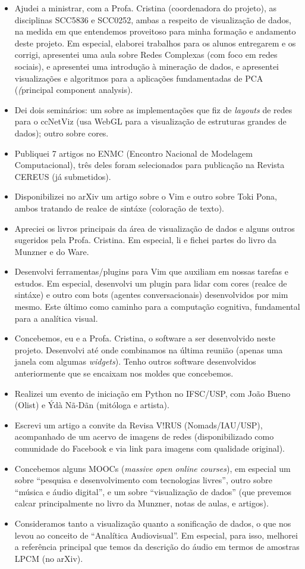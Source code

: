 \documentclass[a4paper, 11pt]{article}
\begin{document}
\begin{itemize}
  \item Ajudei a ministrar, com a Profa. Cristina (coordenadora do projeto), as disciplinas SCC5836 e SCC0252, ambas a respeito de visualização de dados, na medida em que entendemos proveitoso para minha formação e andamento deste projeto.
  Em especial, elaborei trabalhos para os alunos entregarem e os corrigi, apresentei uma aula sobre Redes Complexas (com foco em redes sociais), e apresentei uma introdução à mineração de dados, e apresentei visualizações e algoritmos para a aplicações fundamentadas de PCA (\emph(principal component analysis).
  \item Dei dois seminários: um sobre as implementações que fiz de \emph{layouts} de redes para o ccNetViz (usa WebGL para a visualização de estruturas grandes de dados); outro sobre cores.
  \item Publiquei 7 artigos no ENMC (Encontro Nacional de Modelagem Computacional), três deles foram selecionados para publicação na Revista CEREUS (já submetidos).
  \item Disponibilizei no arXiv um artigo sobre o Vim e outro sobre Toki Pona, ambos tratando de realce de sintáxe (coloração de texto).
  \item Apreciei os livros principais da área de visualização de dados e alguns outros sugeridos pela Profa. Cristina. Em especial, li e fichei partes do livro da Munzner e do Ware.
  \item Desenvolvi ferramentas/plugins para Vim que auxiliam em nossas tarefas e estudos. Em especial, desenvolvi um plugin para lidar com cores (realce de sintáxe) e outro com bots (agentes conversacionais) desenvolvidos por mim mesmo. Este último como caminho para a computação cognitiva, fundamental para a analítica visual.
  \item Concebemos, eu e a Profa. Cristina, o software a ser desenvolvido neste projeto. Desenvolvi até onde combinamos na última reunião (apenas uma janela com algumas \emph{widgets}). Tenho outros software desenvolvidos anteriormente que se encaixam nos moldes que concebemos.
  \item Realizei um evento de iniciação em Python no IFSC/USP, com João Bueno (Olist) e Ýdà Nã-Dãn (mitóloga e artista).
  \item Escrevi um artigo a convite da Revisa V!RUS (Nomads/IAU/USP), acompanhado de um acervo de imagens de redes (disponibilizado como comunidade do Facebook e via link para imagens com qualidade original).
  \item Concebemos alguns MOOCs (\emph{massive open online courses}), em especial um sobre ``pesquisa e desenvolvimento com tecnologias livres'', outro sobre ``música e áudio digital'', e um sobre ``visualização de dados'' (que prevemos calcar principalmente no livro da Munzner, notas de aulas, e artigos).
  \item Consideramos tanto a visualização quanto a sonificação de dados, o que nos levou ao conceito de ``Analítica Audiovisual''. Em especial, para isso, melhorei a referência principal que temos da descrição do áudio em termos de amostras LPCM (no arXiv).
\end{itemize}
\end{document}
